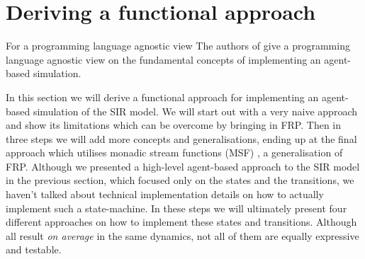 \section{Deriving a functional approach}

For a programming language agnostic view The authors of \cite{thaler_art_2017} give a programming language agnostic view on the fundamental concepts of implementing an agent-based simulation.

In this section we will derive a functional approach for implementing an agent-based simulation of the SIR model. We will start out with a very naive approach and show its limitations which can be overcome by bringing in FRP. Then in three steps we will add more concepts and generalisations, ending up at the final approach which utilises monadic stream functions (MSF) \cite{perez_functional_2016}, a generalisation of FRP.
Although we presented a high-level agent-based approach to the SIR model in the previous section, which focused only on the states and the transitions, we haven't talked about technical implementation details on how to actually implement such a state-machine. In these steps we will ultimately present four different approaches on how to implement these states and transitions. Although all result \textit{on average} in the same dynamics, not all of them are equally expressive and testable.











%